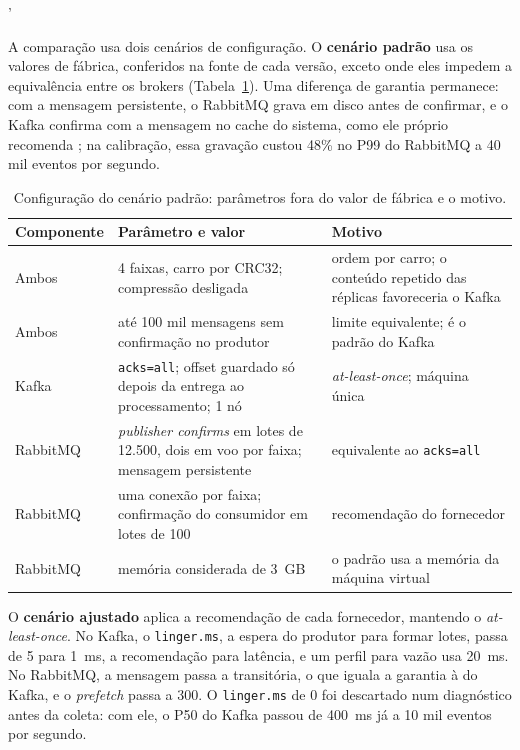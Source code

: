 '\documentclass[12pt]{article}
\begin{document}
A comparação usa dois cenários de configuração. O \textbf{cenário padrão} usa os valores
de fábrica, conferidos na fonte de cada versão, exceto onde eles impedem a equivalência
entre os brokers (Tabela~\ref{tab:configuracao}). Uma diferença de garantia permanece: com
a mensagem persistente, o RabbitMQ grava em disco antes de confirmar, e o Kafka confirma
com a mensagem no cache do sistema, como ele próprio recomenda \cite{kafka:docs}; na
calibração, essa gravação custou 48\% no P99 do RabbitMQ a 40 mil eventos por segundo.

\begin{table}[ht]
\centering
\caption{Configuração do cenário padrão: parâmetros fora do valor de fábrica e o motivo.}
\label{tab:configuracao}
\small
\begin{tabular}{|p{2.2cm}|p{6.4cm}|p{5.3cm}|}
\hline
\textbf{Componente} & \textbf{Parâmetro e valor} & \textbf{Motivo} \\
\hline
Ambos & 4 faixas, carro por CRC32; compressão desligada & ordem por carro; o conteúdo repetido das réplicas favoreceria o Kafka \\
\hline
Ambos & até 100 mil mensagens sem confirmação no produtor & limite equivalente; é o padrão do Kafka \\
\hline
Kafka & \texttt{acks=all}; offset guardado só depois da entrega ao processamento; 1 nó & \textit{at-least-once}; máquina única \\
\hline
RabbitMQ & \textit{publisher confirms} em lotes de 12.500, dois em voo por faixa; mensagem persistente & equivalente ao \texttt{acks=all} \\
\hline
RabbitMQ & uma conexão por faixa; confirmação do consumidor em lotes de 100 & recomendação do fornecedor \\
\hline
RabbitMQ & memória considerada de 3~GB & o padrão usa a memória da máquina virtual \\
\hline
\end{tabular}
\end{table}

O \textbf{cenário ajustado} aplica a recomendação de cada fornecedor, mantendo o
\textit{at-least-once}. No Kafka, o \texttt{linger.ms}, a espera do produtor para formar
lotes, passa de 5 para 1~ms, a recomendação para latência, e um perfil para vazão usa
20~ms. No RabbitMQ, a mensagem passa a transitória, o que iguala a garantia à do Kafka, e o
\textit{prefetch} passa a 300. O \texttt{linger.ms} de 0 foi descartado num diagnóstico
antes da coleta: com ele, o P50 do Kafka passou de 400~ms já a 10 mil eventos por segundo.
\end{document}
